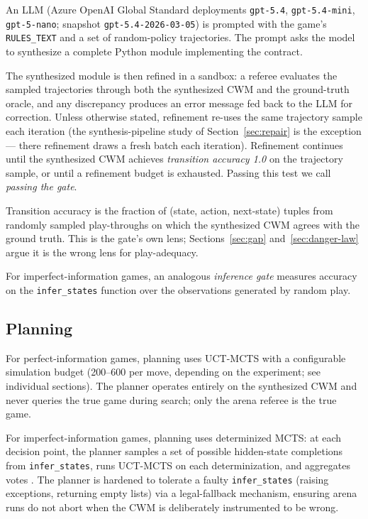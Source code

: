 \documentclass[11pt]{article}
\theoremstyle{remark}
\begin{document}
An LLM (Azure OpenAI Global Standard deployments \texttt{gpt-5.4}, \texttt{gpt-5.4-mini}, \texttt{gpt-5-nano}; snapshot \texttt{gpt-5.4-2026-03-05}) is prompted with the game's \texttt{RULES\_TEXT} and a set of random-policy trajectories. The prompt asks the model to synthesize a complete Python module implementing the contract.

The synthesized module is then refined in a sandbox: a referee evaluates the sampled trajectories through both the synthesized CWM and the ground-truth oracle, and any discrepancy produces an error message fed back to the LLM for correction. Unless otherwise stated, refinement re-uses the same trajectory sample each iteration (the synthesis-pipeline study of Section~\ref{sec:repair} is the exception --- there refinement draws a fresh batch each iteration). Refinement continues until the synthesized CWM achieves \emph{transition accuracy 1.0} on the trajectory sample, or until a refinement budget is exhausted. Passing this test we call \emph{passing the gate}.

Transition accuracy is the fraction of (state, action, next-state) tuples from randomly sampled play-throughs on which the synthesized CWM agrees with the ground truth. This is the gate's own lens; Sections~\ref{sec:gap} and~\ref{sec:danger-law} argue it is the wrong lens for play-adequacy.

For imperfect-information games, an analogous \emph{inference gate} measures accuracy on the \texttt{infer\_states} function over the observations generated by random play.

\subsection{Planning}
\label{sec:planning}

For perfect-information games, planning uses UCT-MCTS with a configurable simulation budget (200--600 per move, depending on the experiment; see individual sections). The planner operates entirely on the synthesized CWM and never queries the true game during search; only the arena referee is the true game.

For imperfect-information games, planning uses determinized MCTS: at each decision point, the planner samples a set of possible hidden-state completions from \texttt{infer\_states}, runs UCT-MCTS on each determinization, and aggregates votes \citep{cowling2012ismcts,long2010pimc}. The planner is hardened to tolerate a faulty \texttt{infer\_states} (raising exceptions, returning empty lists) via a legal-fallback mechanism, ensuring arena runs do not abort when the CWM is deliberately instrumented to be wrong.
\end{document}
